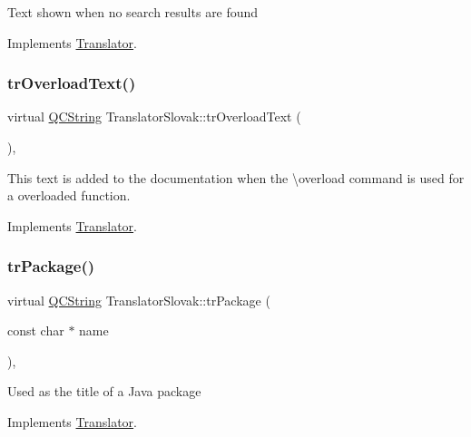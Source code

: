 Text shown when no search results are found 

Implements \mbox{\hyperlink{class_translator}{Translator}}.

\mbox{\label{class_translator_slovak_a1ab3b1a588da754958d03f7d899e42f0}} 
\subsubsection{\texorpdfstring{trOverloadText()}{trOverloadText()}}
{\footnotesize\ttfamily virtual \mbox{\hyperlink{class_q_c_string}{Q\+C\+String}} Translator\+Slovak\+::tr\+Overload\+Text (\begin{DoxyParamCaption}{ }\end{DoxyParamCaption})\hspace{0.3cm}{\ttfamily [inline]}, {\ttfamily [virtual]}}

This text is added to the documentation when the \textbackslash{}overload command is used for a overloaded function. 

Implements \mbox{\hyperlink{class_translator}{Translator}}.

\mbox{\label{class_translator_slovak_a6b03ad95f1a4b4599a1f2be40c78ce02}} 
\subsubsection{\texorpdfstring{trPackage()}{trPackage()}}
{\footnotesize\ttfamily virtual \mbox{\hyperlink{class_q_c_string}{Q\+C\+String}} Translator\+Slovak\+::tr\+Package (\begin{DoxyParamCaption}\item[{const char $\ast$}]{name }\end{DoxyParamCaption})\hspace{0.3cm}{\ttfamily [inline]}, {\ttfamily [virtual]}}

Used as the title of a Java package 

Implements \mbox{\hyperlink{class_translator}{Translator}}.

\mbox{\label{class_translator_slovak_a8cebd149efd746b844fe442125ce6e35}} 
